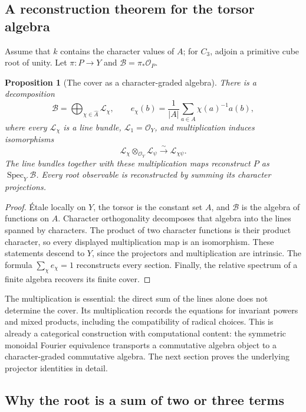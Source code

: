 \documentclass[11pt]{article}
\newtheorem{proposition}{Proposition}[section]
\theoremstyle{remark}
\newcommand{\Spec}{\operatorname{Spec}}
\begin{document}
\subsection{A reconstruction theorem for the torsor algebra}

Assume that \(k\) contains the character values of \(A\); for \(C_3\), adjoin a primitive cube root of unity. Let
\(\pi:P\to Y\) and \(\mathcal B=\pi_*\mathcal O_P\).

\begin{proposition}[The cover as a character-graded algebra]
\label{cover:first-reconstruction}
There is a decomposition
\[
\mathcal B=\bigoplus_{\chi\in\widehat A}\mathcal L_\chi,
\qquad
e_\chi(b)=\frac1{|A|}\sum_{a\in A}\chi(a)^{-1}a(b),
\]
where every \(\mathcal L_\chi\) is a line bundle,
\(\mathcal L_1=\mathcal O_Y\), and multiplication induces isomorphisms
\[
\mathcal L_\chi\otimes_{\mathcal O_Y}\mathcal L_\psi
\overset{\sim}{\longrightarrow}\mathcal L_{\chi\psi}.
\]
The line bundles together with these multiplication maps reconstruct \(P\) as
\(\Spec_Y\mathcal B\). Every root observable is reconstructed by summing its character projections.
\end{proposition}

\begin{proof}
\'Etale locally on \(Y\), the torsor is the constant set \(A\), and
\(\mathcal B\) is the algebra of functions on \(A\). Character orthogonality decomposes that algebra into the lines spanned by characters. The product of two character functions is their product character, so every displayed multiplication map is an isomorphism. These statements descend to \(Y\), since the projectors and multiplication are intrinsic. The formula
\(\sum_\chi e_\chi=1\) reconstructs every section. Finally, the relative spectrum of a finite algebra recovers its finite cover.
\end{proof}

The multiplication is essential: the direct sum of the lines alone does not determine the cover. Its multiplication records the equations for invariant powers and mixed products, including the compatibility of radical choices. This is already a categorical construction with computational content: the symmetric monoidal Fourier equivalence transports a commutative algebra object to a character-graded commutative algebra. The next section proves the underlying projector identities in detail.

\subsection{Why the root is a sum of two or three terms}
\end{document}
